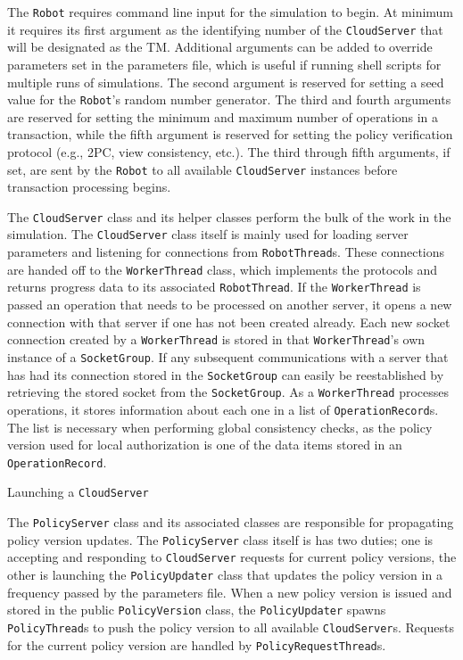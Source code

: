 \documentclass[11pt]{article}
\begin{document}
The \texttt{Robot} requires command line input for the simulation to begin. At minimum it requires its first argument as the identifying number of the \texttt{CloudServer} that will be designated as the TM. Additional arguments can be added to override parameters set in the parameters file, which is useful if running shell scripts for multiple runs of simulations. The second argument is reserved for setting a seed value for the \texttt{Robot}'s random number generator. The third and fourth arguments are reserved for setting the minimum and maximum number of operations in a transaction, while the fifth argument is reserved for setting the policy verification protocol (e.g., 2PC, view consistency, etc.). The third through fifth arguments, if set, are sent by the \texttt{Robot} to all available \texttt{CloudServer} instances before transaction processing begins.

The \texttt{CloudServer} class and its helper classes perform the bulk of the work in the simulation. The \texttt{CloudServer} class itself is mainly used for loading server parameters and listening for connections from \texttt{RobotThread}s. These connections are handed off to the \texttt{WorkerThread} class, which implements the protocols and returns progress data to its associated \texttt{RobotThread}. If the \texttt{WorkerThread} is passed an operation that needs to be processed on another server, it opens a new connection with that server if one has not been created already. Each new socket connection created by a \texttt{WorkerThread} is stored in that \texttt{WorkerThread}'s own instance of a \texttt{SocketGroup}. If any subsequent communications with a server that has had its connection stored in the \texttt{SocketGroup} can easily be reestablished by retrieving the stored socket from the \texttt{SocketGroup}. As a \texttt{WorkerThread} processes operations, it stores information about each one in a list of \texttt{OperationRecord}s. The list is necessary when performing global consistency checks, as the policy version used for local authorization is one of the data items stored in an \texttt{OperationRecord}.

Launching a \texttt{CloudServer}

The \texttt{PolicyServer} class and its associated classes are responsible for propagating policy version updates. The \texttt{PolicyServer} class itself is has two duties; one is accepting and responding to \texttt{CloudServer} requests for current policy versions, the other is launching the \texttt{PolicyUpdater} class that updates the policy version in a frequency passed by the parameters file. When a new policy version is issued and stored in the public \texttt{PolicyVersion} class, the \texttt{PolicyUpdater} spawns \texttt{PolicyThread}s to push the policy version to all available \texttt{CloudServer}s. Requests for the current policy version are handled by \texttt{PolicyRequestThread}s.
\end{document}
